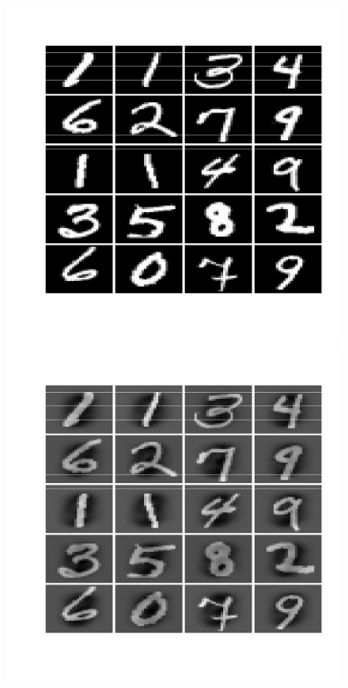 \documentclass{article}
\begin{document}
\begin{figure}\centering
	\includegraphics[scale=0.4]{digits}
	\includegraphics[scale=0.4]{digitspre}
	\caption{}\label{fig:digits}
\end{figure}
\end{document}
